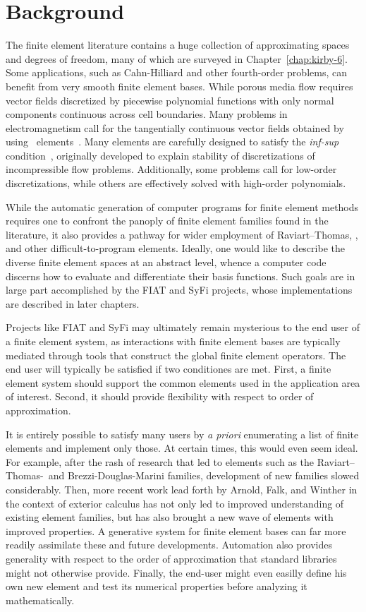 \section{Background}
The finite element literature contains a huge collection of
approximating spaces and degrees of freedom, many of which are
surveyed in Chapter~\ref{chap:kirby-6}.
Some applications, such as Cahn-Hilliard and
other fourth-order problems, can benefit from very smooth finite
element bases.  While porous media flow requires
vector fields discretized by piecewise polynomial functions with
only normal components continuous across cell boundaries.  Many problems in
electromagnetism call for the tangentially continuous vector fields obtained
by using \nedelec\ elements~\citep{Nedelec1980,Nedelec1986}.  Many elements are carefully designed
to satisfy the \emph{inf-sup} condition~\citep{BrezziFortin1991,GiraultRaviart1986},
originally developed to explain stability of discretizations of
incompressible flow problems.  Additionally, some problems call for low-order
discretizations, while others are effectively solved with high-order
polynomials.

While the automatic generation of computer programs for finite element
methods requires one to confront the panoply of  finite
element families found in the literature, it also provides a pathway
for wider employment of Raviart--Thomas, \nedelec, and other
difficult-to-program elements.
Ideally, one would like to
describe the diverse finite element spaces at an abstract level,
whence a computer code discerns how to evaluate and differentiate
their basis functions.  Such goals are in large part accomplished by
the FIAT and SyFi projects, whose implementations are described in
later chapters.

Projects like FIAT and SyFi may ultimately remain
mysterious to the end user of a
finite element system, as
interactions with finite element bases are typically mediated through
tools that construct the global finite element operators.
The end user will typically be satisfied if two conditiones are met.
First, a finite element system
should support the common elements used in the application
area of interest.  Second, it should provide flexibility with respect
to order of approximation.

It is entirely possible to satisfy many users by \emph{a priori}
enumerating a list of finite elements and implement only those.  At certain times, this
would even seem ideal.  For example, after the rash of research
that led to elements such as the Raviart--Thomas-\nedelec\ and
Brezzi-Douglas-Marini families, development of new families slowed
considerably.  Then, more recent work lead forth by  Arnold, Falk, and Winther in the context of exterior
calculus has not only led to
improved understanding of existing element families, but has also
brought a new wave of elements with improved properties.  A
generative system for finite element bases can far more
readily assimilate these and future developments.
Automation also provides generality with respect to the order of approximation that standard libraries
might not otherwise provide. Finally, the end-user might even easilly define his own new element
and test its numerical properties before analyzing it mathematically.


